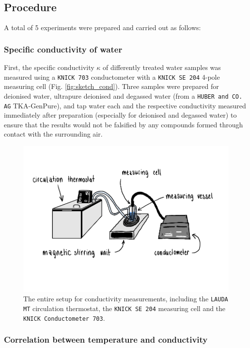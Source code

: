 \subsection{Procedure}
A total of 5 experiments were prepared and carried out as follows:






\subsubsection{Specific conductivity of water}

First, the specific conductivity $\kappa$ of differently treated water samples was measured using a \texttt{KNICK 703} conductometer with a \texttt{KNICK SE 204} 4-pole measuring cell (Fig. \ref{fig:sketch_cond}). Three samples were prepared for deionised water, ultrapure deionised and degassed water (from a \texttt{HUBER and CO. AG} TKA-GenPure), and tap water each and the respective conductivity measured immediately after preparation (especially for deionised and degassed water) to ensure that the results would not be falsified by any compounds formed through contact with the surrounding air. 



\begin{figure}[H]
    \centering
    \includegraphics[width=.5\textwidth]{figures/Conductometer_bigpicture.pdf}
    \caption{The entire setup for conductivity measurements, including the \texttt{LAUDA MT} circulation thermostat, the \texttt{KNICK SE 204} measuring cell and the \texttt{KNICK Conductometer 703}.}
    \label{fig:sketch_cond_2}
\end{figure}

\subsubsection{Correlation between temperature and conductivity}

